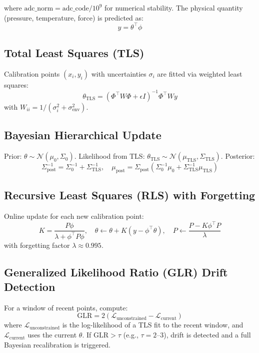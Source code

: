 \documentclass[11pt]{article}
\begin{document}
where $\text{adc\_norm} = \text{adc\_code} / 10^9$ for numerical stability. The physical quantity (pressure, temperature, force) is predicted as:
\[
y = \theta^\top \phi
\]

\subsection{Total Least Squares (TLS)}

Calibration points $(x_i, y_i)$ with uncertainties $\sigma_i$ are fitted via weighted least squares:
\[
\theta_{\text{TLS}} = ( \Phi^\top W \Phi + \epsilon I )^{-1} \Phi^\top W y
\]
with $W_{ii} = 1/(\sigma_i^2 + \sigma_{\text{env}}^2)$.

\subsection{Bayesian Hierarchical Update}

Prior: $\theta \sim \mathcal{N}(\mu_0, \Sigma_0)$. Likelihood from TLS: $\theta_{\text{TLS}} \sim \mathcal{N}(\mu_{\text{TLS}}, \Sigma_{\text{TLS}})$. Posterior:
\[
\Sigma_{\text{post}}^{-1} = \Sigma_0^{-1} + \Sigma_{\text{TLS}}^{-1}, \quad
\mu_{\text{post}} = \Sigma_{\text{post}} \left( \Sigma_0^{-1} \mu_0 + \Sigma_{\text{TLS}}^{-1} \mu_{\text{TLS}} \right)
\]

\subsection{Recursive Least Squares (RLS) with Forgetting}

Online update for each new calibration point:
\[
K = \frac{P \phi}{\lambda + \phi^\top P \phi}, \quad
\theta \leftarrow \theta + K (y - \phi^\top \theta), \quad
P \leftarrow \frac{P - K \phi^\top P}{\lambda}
\]
with forgetting factor $\lambda \approx 0.995$.

\subsection{Generalized Likelihood Ratio (GLR) Drift Detection}

For a window of recent points, compute:
\[
\text{GLR} = 2 \left( \mathcal{L}_{\text{unconstrained}} - \mathcal{L}_{\text{current}} \right)
\]
where $\mathcal{L}_{\text{unconstrained}}$ is the log-likelihood of a TLS fit to the recent window, and $\mathcal{L}_{\text{current}}$ uses the current $\theta$. If $\text{GLR} > \tau$ (e.g., $\tau = 2$--$3$), drift is detected and a full Bayesian recalibration is triggered.
\end{document}
